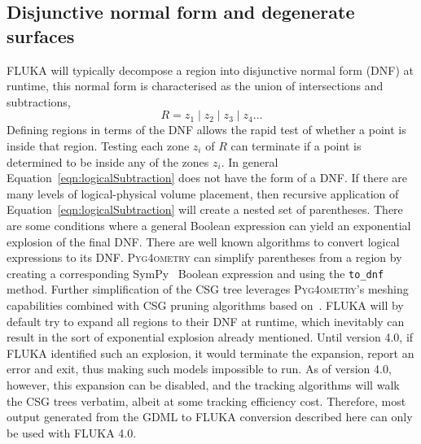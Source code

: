 \documentclass[preprint,12pt]{elsarticle}
\newcommand{\PYGEOMETRY}{\textsc{Pyg4ometry}}
\begin{document}
\subsection{Disjunctive normal form and degenerate surfaces}
FLUKA will typically decompose a region into disjunctive normal form (DNF)
at runtime, this normal form is characterised as the union of intersections and subtractions,
\begin{equation}
R = z_1 \; | \;z_2\;  | \; z_3 	\; | \; z_4 \dots
\end{equation}
Defining regions in terms of the DNF allows the rapid test of whether a point is inside that region. Testing each zone
$z_i$ of $R$ can terminate if a point is determined to be inside any of the zones $z_i$. In general
Equation~\ref{eqn:logicalSubtraction} does not have the form of a DNF. If there are many levels of logical-physical volume
placement, then recursive application of  Equation~\ref{eqn:logicalSubtraction} will create a nested set of
parentheses. There are some conditions where a general Boolean expression can yield an exponential
explosion of the final DNF. There are well known algorithms to convert logical expressions to its DNF.
\PYGEOMETRY{} can simplify parentheses from a region by creating a corresponding SymPy~\cite{10.7717/peerj-cs.103} Boolean
expression and using the \verb|to_dnf| method.  Further simplification of the CSG tree leverages \PYGEOMETRY{}'s
meshing capabilities combined with CSG pruning algorithms based
on~\cite{pruning}.  FLUKA will by default try to expand all regions to
their DNF at runtime, which inevitably can result in the sort of exponential explosion already mentioned.  Until version 4.0, if FLUKA identified
such an explosion, it would terminate the expansion, report an error and exit, thus making such models impossible to run.  As of version 4.0, however, this
expansion can be disabled, and the tracking algorithms will walk the CSG trees verbatim, albeit at some tracking efficiency cost.  Therefore, most
output generated from the GDML to FLUKA conversion described here can only be used with FLUKA 4.0.
\end{document}
